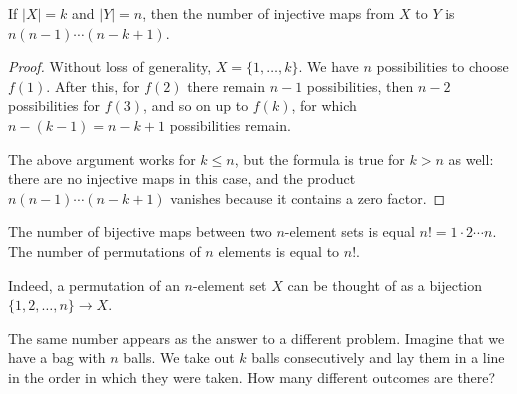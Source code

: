 \begin{page}
\setcounter{section}{2}
\setcounter{subsection}{3}
\setcounter{dfn}{8}
\label{portion:45}

\begin{thm}
If $|X|=k$ and $|Y|=n$, then the number of injective maps from $X$ to $Y$ is $n(n-1) \cdots (n-k+1)$.
\end{thm}

\end{page}

\begin{page}
\setcounter{section}{2}
\setcounter{subsection}{3}
\setcounter{dfn}{8}
\label{portion:46}

\begin{proof}
Without loss of generality, $X = \{1, \ldots, k\}$.
We have $n$ possibilities to choose $f(1)$.
After this, for $f(2)$ there remain $n-1$ possibilities, then $n-2$ possibilities for $f(3)$,
and so on up to $f(k)$, for which $n-(k-1) = n-k+1$ possibilities remain.

The above argument works for $k \le n$, but the formula is true for $k > n$ as well:
there are no injective maps in this case, and the product $n(n-1) \cdots (n-k+1)$ vanishes because it contains a zero factor.
\end{proof}


\end{page}

\begin{page}
\setcounter{section}{2}
\setcounter{subsection}{3}
\setcounter{dfn}{9}
\label{portion:48}

\begin{cor}
\label{cor:NumberOfBijections}
The number of bijective maps between two $n$-element sets is equal $n! = 1 \cdot 2 \cdots n$.
The number of permutations of $n$ elements is equal to $n!$.
\end{cor}

\end{page}

\begin{page}
\setcounter{section}{2}
\setcounter{subsection}{3}
\setcounter{dfn}{9}
\label{portion:49}

Indeed, a permutation of an $n$-element set $X$ can be thought of as a bijection $\{1, 2, \ldots, n\} \to X$.

The same number appears as the answer to a different problem.
Imagine that we have a bag with $n$ balls.
We take out $k$ balls consecutively and lay them in a line in the order in which they were taken.
How many different outcomes are there?


\end{page}

